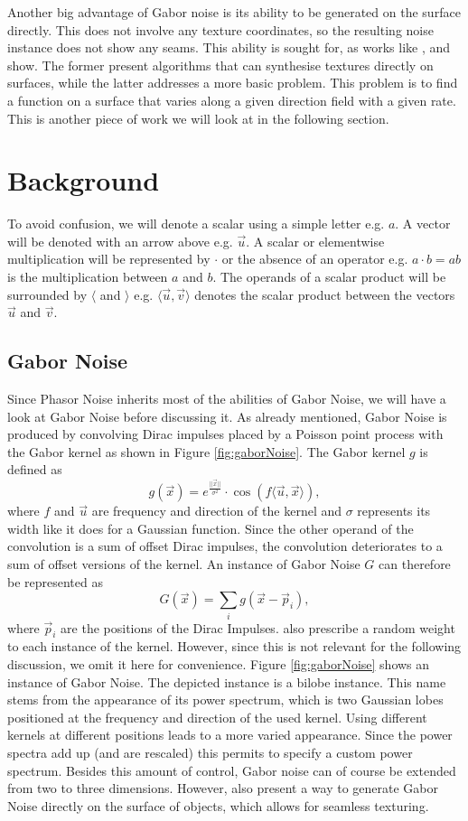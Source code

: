 \documentclass{utue} %
\begin{document}
Another big advantage of Gabor noise is its ability to be generated on the surface directly. This does not involve any texture coordinates, so the resulting noise instance does not show any seams. This ability is sought for, as works like \cite{appearanceTextureSynthesis}, \cite{textureSynthesis} and \cite{stripes} show. The former present algorithms that can synthesise textures directly on surfaces, while the latter addresses a more basic problem. This problem is to find a function on a surface that varies along a given direction field with a given rate. This is another piece of work we will look at in the following section.

\section{Background}
To avoid confusion, we will denote a scalar using a simple letter e.g. $a$. A vector will be denoted with an arrow above e.g. $\vec{u}$. A scalar or elementwise multiplication will be represented by $\cdot$ or the absence of an operator e.g. $a\cdot b=ab$ is the multiplication between $a$ and $b$. The operands of a scalar product will be surrounded by $\langle$ and $\rangle$ e.g. $\langle\vec{u},\vec{v}\rangle$ denotes the scalar product between the vectors $\vec{u}$ and $\vec{v}$.

\subsection{Gabor Noise}
Since Phasor Noise inherits most of the abilities of Gabor Noise, we will have a look at Gabor Noise before discussing it. As already mentioned, Gabor Noise is produced by convolving Dirac impulses placed by a Poisson point process with the Gabor kernel as shown in Figure \ref{fig:gaborNoise}. The Gabor kernel $g$ is defined as
$$
g(\vec{x}) = e^{\frac{||\vec{x}||}{\sigma^2}}\cdot \cos{(f\langle\vec{u},\vec{x}\rangle)},
$$
where $f$ and $\vec{u}$ are frequency and direction of the kernel and $\sigma$ represents its width like it does for a Gaussian function. Since the other operand of the convolution is a sum of offset Dirac impulses, the convolution deteriorates to a sum of offset versions of the kernel. An instance of Gabor Noise $G$ can therefore be represented as
$$
G(\vec{x}) = \sum_ig(\vec{x}-\vec{p}_i),
$$
where $\vec{p}_i$ are the positions of the Dirac Impulses. \citeauthor{gaborNoise} also prescribe a random weight to each instance of the kernel. However, since this is not relevant for the following discussion, we omit it here for convenience. Figure \ref{fig:gaborNoise} shows an instance of Gabor Noise. The depicted instance is a bilobe instance. This name stems from the appearance of its power spectrum, which is two Gaussian lobes positioned at the frequency and direction of the used kernel. Using different kernels at different positions leads to a more varied appearance. Since the power spectra add up (and are rescaled) this permits to specify a custom power spectrum. Besides this amount of control, Gabor noise can of course be extended from two to three dimensions. However, \citeauthor{gaborNoise} also present a way to generate Gabor Noise directly on the surface of objects, which allows for seamless texturing.
\end{document}
